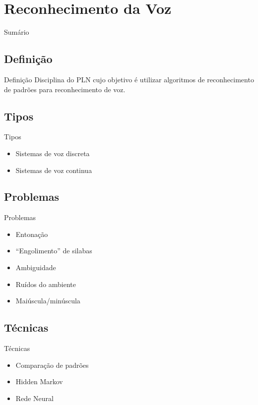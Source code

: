 \renewcommand{\titulo}{Reconhecimento da Voz}
\section{\titulo}

\begin{frame}{Sumário}
\tableofcontents[currentsection]
\end{frame}

\renewcommand{\titulo}{Definição}
\subsection{\titulo}
\begin{frame}{\titulo}
Disciplina do PLN cujo objetivo é utilizar algoritmos de reconhecimento de padrões para reconhecimento de voz.
\end{frame}

\renewcommand{\titulo}{Tipos}
\subsection{\titulo}
\begin{frame}{\titulo}
\begin{itemize}
\item Sistemas de voz discreta
\item Sistemas de voz continua
\end{itemize}
\end{frame}

\renewcommand{\titulo}{Problemas}
\subsection{\titulo}
\begin{frame}{\titulo}
\begin{itemize}
\item Entonação
\item ``Engolimento'' de silabas
\item Ambiguidade
\item Ruídos do ambiente
\item Maiúscula/minúscula
\end{itemize}
\end{frame}

\renewcommand{\titulo}{Técnicas}
\subsection{\titulo}
\begin{frame}{\titulo}
\begin{itemize}
\item Comparação de padrões
\item Hidden Markov
\item Rede Neural
\end{itemize}
\end{frame}



